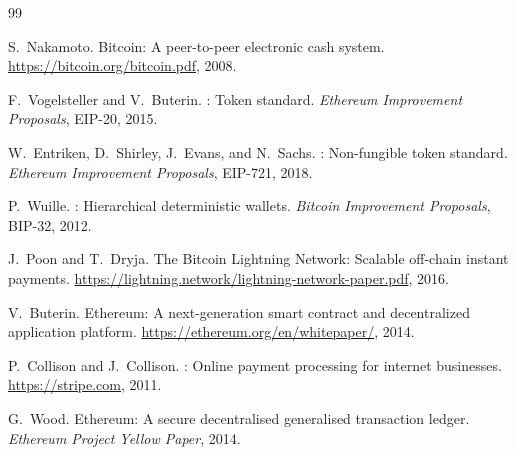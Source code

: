\documentclass[11pt,twocolumn]{article}
\begin{document}
\begin{thebibliography}{99}

S.~Nakamoto.
\newblock Bitcoin: A peer-to-peer electronic cash system.
\newblock \url{https://bitcoin.org/bitcoin.pdf}, 2008.

F.~Vogelsteller and V.~Buterin.
: Token standard.
\newblock \emph{Ethereum Improvement Proposals}, EIP-20, 2015.

W.~Entriken, D.~Shirley, J.~Evans, and N.~Sachs.
: Non-fungible token standard.
\newblock \emph{Ethereum Improvement Proposals}, EIP-721, 2018.

P.~Wuille.
: Hierarchical deterministic wallets.
\newblock \emph{Bitcoin Improvement Proposals}, BIP-32, 2012.

J.~Poon and T.~Dryja.
\newblock The {Bitcoin Lightning Network}: Scalable off-chain instant payments.
\newblock \url{https://lightning.network/lightning-network-paper.pdf}, 2016.

V.~Buterin.
\newblock Ethereum: A next-generation smart contract and decentralized
application platform.
\newblock \url{https://ethereum.org/en/whitepaper/}, 2014.

P.~Collison and J.~Collison.
: Online payment processing for internet businesses.
\newblock \url{https://stripe.com}, 2011.

G.~Wood.
\newblock Ethereum: A secure decentralised generalised transaction ledger.
\newblock \emph{Ethereum Project Yellow Paper}, 2014.

\end{thebibliography}
\end{document}
